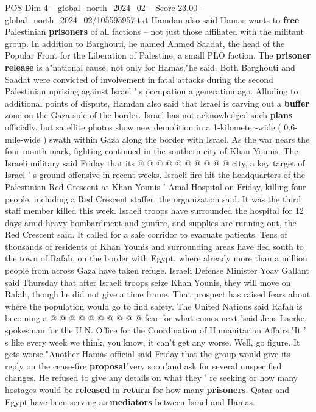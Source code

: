 \begin{textsample}{POS Dim 4 – global\_north\_2024\_02 – Score 23.00 – global\_north\_2024\_02/105595957.txt}
Hamdan also said Hamas wants to \textbf{free} Palestinian \textbf{prisoners} of all factions -- not just those affiliated with the militant group.
In addition to Barghouti, he named Ahmed Saadat, the head of the Popular Front for the Liberation of Palestine, a small PLO faction.
The \textbf{prisoner} \textbf{release} is a"national cause, not only for Hamas,"he said.
Both Barghouti and Saadat were convicted of involvement in fatal attacks during the second Palestinian uprising against Israel ' s occupation a generation ago.
Alluding to additional points of dispute, Hamdan also said that Israel is carving out a \textbf{buffer} zone on the Gaza side of the border.
Israel has not acknowledged such \textbf{plans} officially, but satellite photos show new demolition in a 1-kilometer-wide ( 0.6-mile-wide ) swath within Gaza along the border with Israel.
As the war nears the four-month mark, fighting continued in the southern city of Khan Younis.
The Israeli military said Friday that its @ @ @ @ @ @ @ @ @ @ city, a key target of Israel ' s ground offensive in recent weeks.
Israeli fire hit the headquarters of the Palestinian Red Crescent at Khan Younis ' Amal Hospital on Friday, killing four people, including a Red Crescent staffer, the organization said.
It was the third staff member killed this week.
Israeli troops have surrounded the hospital for 12 days amid heavy bombardment and gunfire, and supplies are running out, the Red Crescent said.
It called for a safe corridor to evacuate patients.
Tens of thousands of residents of Khan Younis and surrounding areas have fled south to the town of Rafah, on the border with Egypt, where already more than a million people from across Gaza have taken refuge.
Israeli Defense Minister Yoav Gallant said Thursday that after Israeli troops seize Khan Younis, they will move on Rafah, though he did not give a time frame.
That prospect has raised fears about where the population would go to find safety.
The United Nations said Rafah is becoming a @ @ @ @ @ @ @ @ @ @ fear for what comes next,"said Jens Laerke, spokesman for the U.N.
Office for the Coordination of Humanitarian Affairs."It ' s like every week we think, you know, it can't get any worse.
Well, go figure.
It gets worse."Another Hamas official said Friday that the group would give its reply on the cease-fire \textbf{proposal}"very soon"and ask for several unspecified changes.
He refused to give any details on what they ' re seeking or how many hostages would be \textbf{released} in \textbf{return} for how many \textbf{prisoners}.
Qatar and Egypt have been serving as \textbf{mediators} between Israel and Hamas.

\end{textsample}
